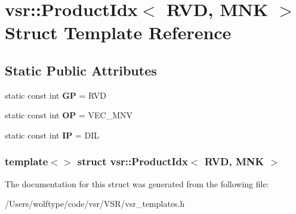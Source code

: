 \hypertarget{structvsr_1_1_product_idx_3_01_r_v_d_00_01_m_n_k_01_4}{\section{vsr\-:\-:Product\-Idx$<$ R\-V\-D, M\-N\-K $>$ Struct Template Reference}
\label{structvsr_1_1_product_idx_3_01_r_v_d_00_01_m_n_k_01_4}
}
\subsection*{Static Public Attributes}
\begin{DoxyCompactItemize}
\item 
\hypertarget{structvsr_1_1_product_idx_3_01_r_v_d_00_01_m_n_k_01_4_a5f440d18eda75dd014fe574732ce29c5}{static const int {\bfseries G\-P} = R\-V\-D}\label{structvsr_1_1_product_idx_3_01_r_v_d_00_01_m_n_k_01_4_a5f440d18eda75dd014fe574732ce29c5}

\item 
\hypertarget{structvsr_1_1_product_idx_3_01_r_v_d_00_01_m_n_k_01_4_afd7716ef12ad71f34b4a3c3ea64cc823}{static const int {\bfseries O\-P} = V\-E\-C\-\_\-\-M\-N\-V}\label{structvsr_1_1_product_idx_3_01_r_v_d_00_01_m_n_k_01_4_afd7716ef12ad71f34b4a3c3ea64cc823}

\item 
\hypertarget{structvsr_1_1_product_idx_3_01_r_v_d_00_01_m_n_k_01_4_afd433601234b5dad86590d4be3657308}{static const int {\bfseries I\-P} = D\-I\-L}\label{structvsr_1_1_product_idx_3_01_r_v_d_00_01_m_n_k_01_4_afd433601234b5dad86590d4be3657308}

\end{DoxyCompactItemize}
\subsubsection*{template$<$$>$ struct vsr\-::\-Product\-Idx$<$ R\-V\-D, M\-N\-K $>$}



The documentation for this struct was generated from the following file\-:\begin{DoxyCompactItemize}
\item 
/\-Users/wolftype/code/vsr/\-V\-S\-R/vsr\-\_\-templates.\-h\end{DoxyCompactItemize}

